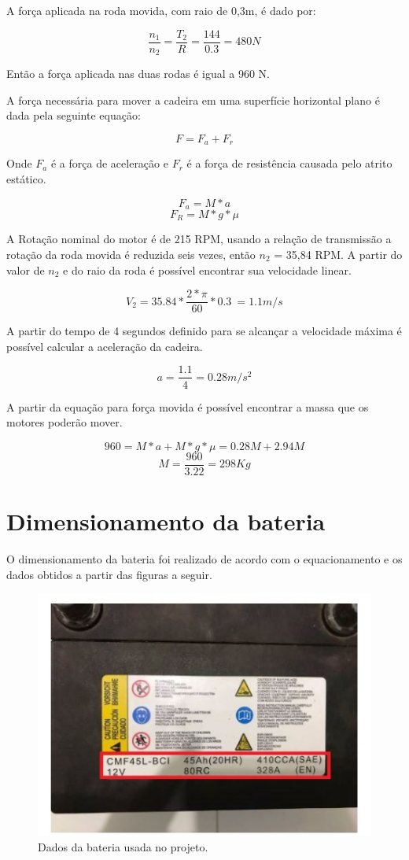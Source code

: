 A força aplicada na roda movida, com raio de 0,3m, é dado por:

\[\frac{n_1}{n_2} = \frac{T_2}{R} = \frac{144}{0.3} = 480 N\]

Então a força aplicada nas duas rodas é igual a 960 N.

A força necessária para mover a cadeira em uma superfície horizontal plano é dada pela seguinte equação:

\[F = F_a + F_r\]

Onde \(F_a\) é a força de aceleração e \(F_r\)  é a força de resistência causada pelo atrito estático.

\[F_a = M*a\]
\[F_R = M*g*\mu\]

A Rotação nominal do motor é de 215 RPM, usando a relação de transmissão a
rotação da roda movida é reduzida seis vezes, então \(n_2\) = 35,84 RPM. A
partir do valor de \(n_2\) e do raio da roda é possível encontrar sua
velocidade linear.

\[V_2 = 35.84 * \frac{2*\pi}{60}*0.3\ = 1.1 m/s\] 

A partir do tempo de 4 segundos definido para se alcançar a velocidade máxima
é possível calcular a aceleração da cadeira.

\[a = \frac{1.1}{4} = 0.28 m/s^2\]

A partir da equação para força movida é possível encontrar a massa que os
motores poderão mover.

\[960 = M*a + M*g*\mu = 0.28M + 2.94M\]
\[M = \frac{960}{3.22} = 298 Kg\]

\section{Dimensionamento da bateria}

O dimensionamento da bateria foi realizado de acordo com o equacionamento e
os dados obtidos a partir das figuras a seguir.

\begin{figure}[h!]
  \centering
  \includegraphics{figuras/Bateria1.jpg}
  \caption{Dados da bateria usada no projeto.}
\end{figure}

